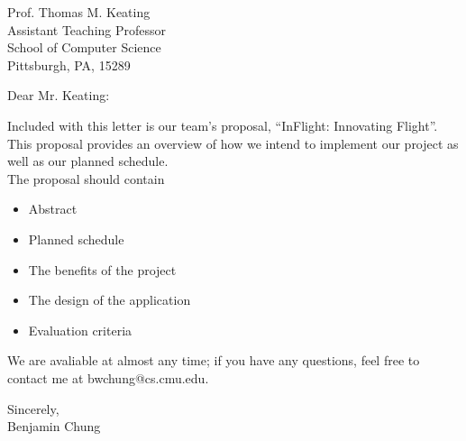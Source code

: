 \documentclass[10pt,a4paper]{letter}
\begin{document}
 
\begin{letter}{
Prof. Thomas M. Keating\\
Assistant Teaching Professor\\
School of Computer Science\\
Pittsburgh, PA, 15289} 
\opening{Dear Mr. Keating:} 

Included with this letter is our team's proposal, ``InFlight: Innovating Flight''. This proposal provides an overview of how we intend to implement our project as well as our planned schedule.\\

The proposal should contain
\begin{itemize}
\item Abstract
\item Planned schedule
\item The benefits of the project
\item The design of the application
\item Evaluation criteria\\
\end{itemize}

We are avaliable at almost any time; if you have any questions, feel free to contact me at bwchung@cs.cmu.edu.
\closing{Sincerely,\\ Benjamin Chung} 
\end{letter} 
\end{document}
